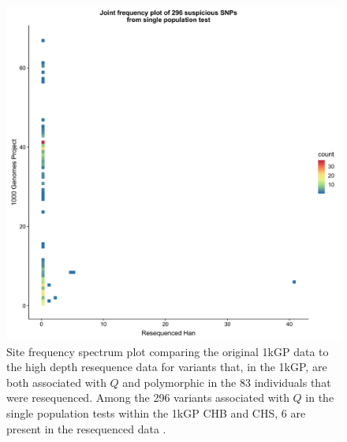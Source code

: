 \documentclass[9pt,lineno]{template}
\begin{document}
\begin{figure}[h]
\centering
\includegraphics[width=12cm,keepaspectratio]{../Figures/Han_1kGP_SFS_singlePop.jpg}
\caption{Site frequency spectrum plot comparing the original 1kGP data to the high depth resequence data for variants that, in the 1kGP, are both associated with $Q$ and polymorphic in the 83 individuals that were resequenced.
Among the 296 variants associated with $Q$ in the single population tests within the 1kGP CHB and CHS, 6 are present in the resequenced data \citep{Lan2017}.}  
\label{90HanSFS}
\end{figure}
\end{document}
